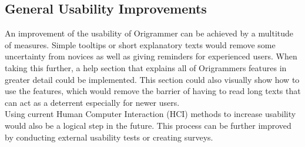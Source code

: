 \subsection{General Usability Improvements}

An improvement of the usability of Origrammer can be achieved by a multitude of measures.
Simple tooltips or short explanatory texts would remove some uncertainty from novices as well as giving reminders for experienced users. When taking this further, a help section that explains all of Origrammers features in greater detail could be implemented. This section could also visually show how to use the features, which would remove the barrier of having to read long texts that can act as a deterrent especially for newer users.
\\
Using current Human Computer Interaction (HCI) methods to increase usability would also be a logical step in the future. This process can be further improved by conducting external usability tests or creating surveys.